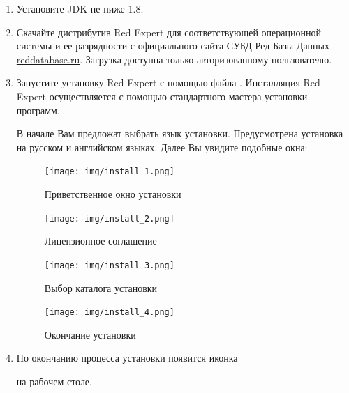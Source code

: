 \begin{enumerate}[leftmargin=15pt]
	\item Установите JDK не ниже 1.8.
	\item Скачайте дистрибутив Red Expert для соответствующей операционной системы и ее разрядности с официального сайта СУБД Ред Базы Данных --- \href{http://reddatabase.ru/downloads/redexpert/}{reddatabase.ru}. Загрузка доступна только авторизованному пользователю.
	\item Запустите установку Red Expert с помощью файла . Инсталляция Red Expert осуществляется с помощью стандартного мастера установки программ.
	
	В начале Вам предложат выбрать язык установки. Предусмотрена установка на русском и английском языках. Далее Вы увидите подобные окна:

\begin{figure}[H]
	\begin{center}
		\begin{minipage}[h]{0.49\linewidth}
			\texttt{[image: img/install\_1.png]}
			\caption{Приветственное окно установки} 
		\end{minipage}
		\hfill 
		\begin{minipage}[h]{0.49\linewidth}
			\texttt{[image: img/install\_2.png]}
			\caption{Лицензионное соглашение}
		\end{minipage}
	\end{center}
\end{figure}

\begin{figure}[H]
	\begin{center}
		\begin{minipage}[h]{0.49\linewidth}
			\texttt{[image: img/install\_3.png]}
			\caption{Выбор каталога установки} 
		\end{minipage}
		\hfill 
		\begin{minipage}[h]{0.49\linewidth}
			\texttt{[image: img/install\_4.png]}
			\caption{Окончание установки}
		\end{minipage}
	\end{center}
\end{figure}

\item По окончанию процесса установки появится иконка 
на рабочем столе.


\end{enumerate}
